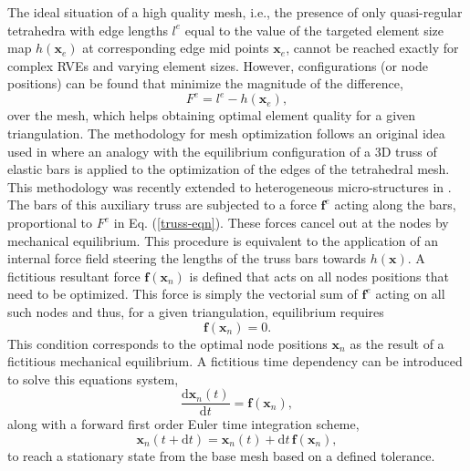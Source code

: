 The ideal situation of a high quality mesh, i.e., the presence of only quasi-regular tetrahedra with edge lengths $ l^e $ equal to the value of the targeted element size map $ h(\textbf{x}_e) $ at corresponding edge mid points $ \textbf{x}_e $, cannot be reached exactly for complex RVEs and varying element sizes. However, configurations (or node positions) can be found that minimize the magnitude of the difference, 
\begin{equation}
F^e=l^e-h(\textbf{x}_e),\label{truss-eqn}
\end{equation}
over the mesh, which helps obtaining optimal element quality for a given triangulation. The methodology for mesh optimization follows an original idea used in \cite{perssonSimpleMeshGenerator2004} where an analogy with the equilibrium configuration of a 3D truss of elastic bars is applied to the optimization of the edges of the tetrahedral mesh. This methodology was recently extended to heterogeneous micro-structures in \cite{ehabmoustafakamelIntegratedApproachConformal2019}. The bars of this auxiliary truss are subjected to a force $ \textbf{f}^e $ acting along the bars, proportional to $ F^e $ in Eq. (\ref{truss-eqn}). These forces cancel out at the nodes by mechanical equilibrium. This procedure is equivalent to the application of an internal force field steering the lengths of the truss bars towards $h(\textbf{x})$. A fictitious resultant force $ \textbf{f}(\textbf{x}_n) $ is defined that acts on all nodes positions that need to be optimized. This force is simply the vectorial sum of $ \textbf{f}^e $ acting on all such nodes and thus, for a given triangulation, equilibrium requires
\begin{equation}
\textbf{f}(\textbf{x}_n)=0.\label{truss-equi}
\end{equation} 
This condition corresponds to the optimal node positions $ \textbf{x}_n $ as the result of a fictitious mechanical equilibrium. A fictitious time dependency can be introduced to solve this equations system,
\begin{equation}
\frac{\text{d}\textbf{x}_n(t)}{\text{d}t}=\textbf{f}(\textbf{x}_n) ,
\end{equation}
along with a forward first order Euler time integration scheme,
\begin{equation} \textbf{x}_n(t+\text{d}t)=\textbf{x}_n(t)+\text{d}t\,\textbf{f}(\textbf{x}_n)  ,
\end{equation}
to reach a stationary state from the base mesh based on a defined tolerance. 

